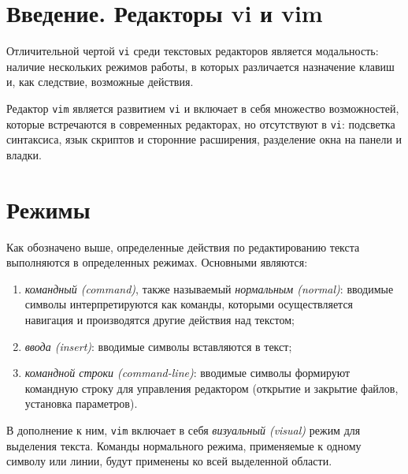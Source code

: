 \documentclass[listings]{labreport}
\begin{document}
\maketitlepage

\section*{Введение. Редакторы vi и vim}

Отличительной чертой \texttt{vi} среди текстовых редакторов является модальность:
наличие нескольких режимов работы, в которых различается назначение клавиш
и, как следствие, возможные действия.

Редактор \texttt{vim} является развитием \texttt{vi} и включает в себя
множество возможностей, которые встречаются в современных редакторах, но
отсутствуют в \texttt{vi}: подсветка синтаксиса, язык скриптов и сторонние расширения,
разделение окна на панели и владки.

\section*{Режимы}

Как обозначено выше, определенные действия по редактированию текста
выполняются в определенных режимах. Основными являются:

\begin{enumerate}
\item \textit{командный (command)}, также называемый \textit{нормальным (normal)}:
  вводимые символы интерпретируются как команды, которыми осуществляется навигация
  и производятся другие действия над текстом;
\item \textit{ввода (insert)}: вводимые символы вставляются в текст;
\item \textit{командной строки (command-line)}: вводимые символы формируют
  командную строку для управления редактором (открытие и закрытие файлов,
  установка параметров).
\end{enumerate}

В дополнение к ним, \texttt{vim} включает в себя \textit{визуальный (visual)} режим
для выделения текста. Команды нормального режима, применяемые к одному символу или линии,
будут применены ко всей выделенной области. 
\end{document}
